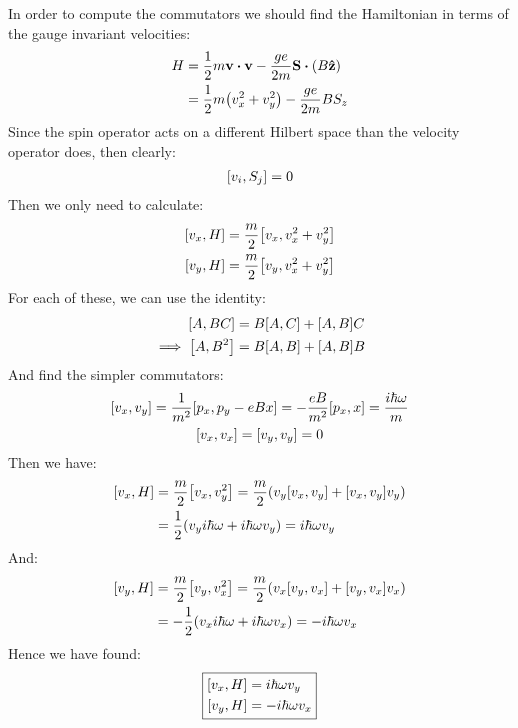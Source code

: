 In order to compute the commutators we should find the Hamiltonian in terms of the gauge invariant velocities:
\begin{align*}
  H&=\frac12m\vb{v\vdot v}-\frac{ge}{2m}\vb{S}\vdot(B\vu{z})\\
  &=\frac12m\qty(v_x^2+v_y^2)-\frac{ge}{2m}BS_z
\end{align*}
Since the spin operator acts on a different Hilbert space than the velocity operator does, then clearly:
\begin{align*}
  \comm{v_i}{S_j}=0
\end{align*}
Then we only need to calculate:
\begin{align*}
  \comm{v_x}{H}&=\frac{m}2\comm{v_x}{v_x^2+v_y^2}\\
  \comm{v_y}{H}&=\frac{m}2\comm{v_y}{v_x^2+v_y^2}
\end{align*}
For each of these, we can use the identity:
\begin{align*}
  \comm{A}{BC}&=B\comm{A}{C}+\comm{A}{B}C\\
  \implies\comm{A}{B^2}&=B\comm{A}{B}+\comm{A}{B}B
\end{align*}
And find the simpler commutators:
\begin{gather*}
  \comm{v_x}{v_y}=\frac1{m^2}\comm{p_x}{p_y-eBx}=-\frac{eB}{m^2}\comm{p_x}{x}
  =\frac{i\hbar\omega}{m}\\
  \comm{v_x}{v_x}=\comm{v_y}{v_y}=0
\end{gather*}
Then we have:
\begin{align*}
  \comm{v_x}{H}&=\frac{m}2\comm{v_x}{v_y^2}
  =\frac{m}2\qty(v_y\comm{v_x}{v_y}+\comm{v_x}{v_y}v_y)\\
  &=\frac12\qty(v_y i\hbar\omega+i\hbar\omega v_y)=i\hbar\omega v_y
\end{align*}
And:
\begin{align*}
  \comm{v_y}{H}&=\frac{m}2\comm{v_y}{v_x^2}
  =\frac{m}2\qty(v_x\comm{v_y}{v_x}+\comm{v_y}{v_x}v_x)\\
  &=-\frac12\qty(v_x i\hbar\omega+i\hbar\omega v_x)=-i\hbar\omega v_x
\end{align*}
Hence we have found:
\begin{equation}
  \boxed{\begin{aligned}
      \comm{v_x}{H}&=i\hbar\omega v_y\\
      \comm{v_y}{H}&=-i\hbar\omega v_x
  \end{aligned}}
\end{equation}

